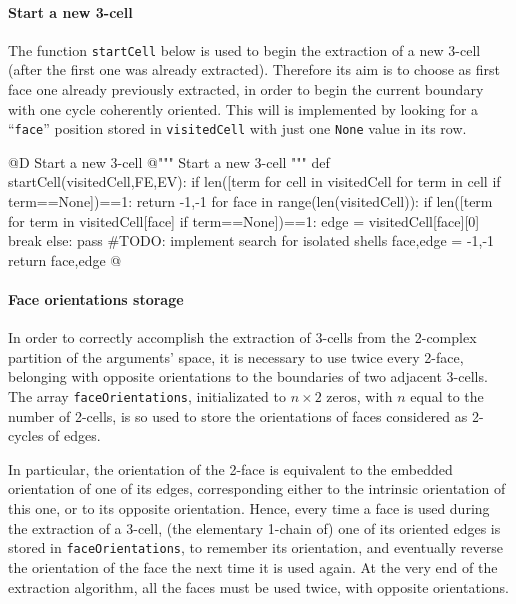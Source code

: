 \documentclass[11pt,oneside]{article}    %
\begin{document}
\paragraph{Start a new 3-cell}
The function \texttt{startCell} below is used to begin the extraction of a new 3-cell (after the first one was already extracted). Therefore its aim is to choose as first face one already previously extracted, in order to begin the current boundary with one cycle coherently oriented. This will is implemented by looking for a ``\texttt{face}'' position stored in \texttt{visitedCell} with just one \texttt{None} value in its row.

@D Start a new 3-cell
@{""" Start a new 3-cell """
def startCell(visitedCell,FE,EV):
    if len([term for cell in visitedCell for term in cell if term==None])==1: return -1,-1
    for face in range(len(visitedCell)):
        if len([term for term in visitedCell[face] if term==None])==1:
            edge = visitedCell[face][0]
            break
        else: pass  #TODO: implement search for isolated shells
        face,edge = -1,-1
    return face,edge
@}

\paragraph{Face orientations storage}

In order to correctly accomplish the extraction of 3-cells from the 2-complex partition of the arguments' space, it is necessary to use twice every 2-face, belonging with opposite orientations to the boundaries of two adjacent 3-cells. The array \texttt{faceOrientations}, initializated to $n\times 2$ zeros, with $n$ equal to the number of 2-cells, is so used to store the orientations of faces considered as 2-cycles of edges. 

In particular, the orientation of the 2-face is equivalent to the embedded orientation of one of its edges, corresponding either to the intrinsic orientation of this one, or to its opposite orientation. Hence, every time a face is used during the extraction of a 3-cell, (the elementary 1-chain of) one of its oriented edges is stored in \texttt{faceOrientations}, to remember its orientation, and eventually reverse the orientation of the face the next time it is used again. At the very end of the extraction algorithm, all the faces must be used twice, with opposite orientations. 
\end{document}
